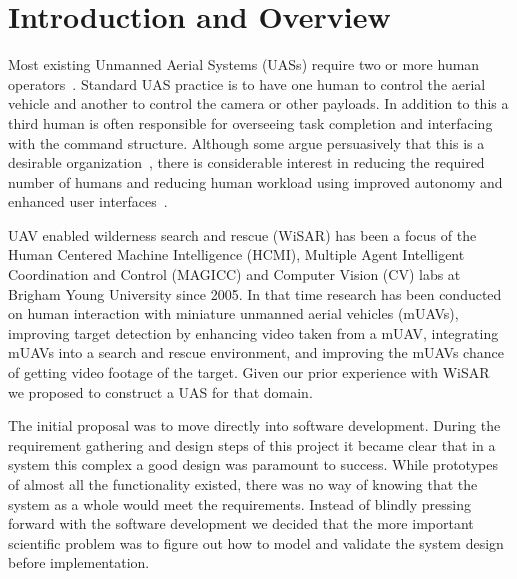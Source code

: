 \chapter{Introduction and Overview}

Most existing Unmanned Aerial Systems (UASs) require two or more human operators~\cite{GoodrichMorse2008,MurphyStoverPrattGriffin2006}. Standard UAS practice is to have one human to control the aerial vehicle and another to control the camera or other payloads. In addition to this a third human is often responsible for overseeing task completion and interfacing with the command structure. Although some argue persuasively that this is a desirable organization~\cite{MurphyBurke2010}, there is considerable interest in reducing the required number of humans and reducing human workload using improved autonomy and enhanced user interfaces~\cite{Cummings2007,MitchellCummings2005,goodrich2010fanout}.

UAV enabled wilderness search and rescue (WiSAR) has been a focus of the Human
Centered Machine Intelligence (HCMI), Multiple Agent Intelligent Coordination and Control (MAGICC) and Computer Vision (CV) labs at Brigham Young University since 2005.  In that time research has been conducted on human interaction with miniature unmanned aerial vehicles (mUAVs), improving target detection by enhancing video taken from a mUAV, integrating mUAVs into a search and rescue environment,
and improving the mUAVs chance of getting video footage of the target.   Given our prior experience with WiSAR~\cite{goodrich2009towards} we proposed to construct a UAS for that domain.  

The initial proposal was to move directly into software development.  During the requirement gathering and design steps of this project it became clear that in a system this complex a good design was paramount to success.  While prototypes of almost all the functionality existed, there was no way of knowing that the system as a whole would meet the requirements.  Instead of blindly pressing forward with the software development we decided that the more important scientific problem was to figure out how to model and validate the system design before implementation.

